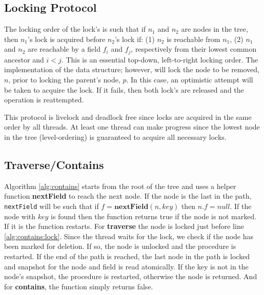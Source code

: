 \documentclass[conference]{IEEEtran}
\theoremstyle{definition}
\theoremstyle{theorem}
\begin{document}
\subsection{Locking Protocol}
The locking order of the lock's is such that if $n_1$ and $n_2$ are nodes in the tree, then $n_1$'s lock is acquired before $n_2$'s lock if: (1) $n_2$ is reachable from $n_1$, (2) $n_1$ and $n_2$ are reachable by a field $f_i$ and $f_j$, respectively from their lowest common ancestor and $i<j$. This is an essential top-down, left-to-right locking order. The implementation of the data structure; however, will lock the node to be removed, $n$, prior to locking the parent's node, $p$. In this case, an optimistic attempt will be taken to acquire the lock. If it fails, then both lock's are released and the operation is reattempted.

This protocol is livelock and deadlock free since locks are acquired in the same order by all threads. At least one thread can make progress since the lowest node in the tree (level-ordering) is guaranteed to acquire all necessary locks.

\subsection{Traverse/Contains}
Algorithm \ref{alg:contains} starts from the root of the tree and uses a helper function \textbf{nextField} to reach the next node. If the node is the last in the path, \texttt{nextField} will be such that if $f=\mathbf{nextField}(n, key)$ then $n.f = null$. If the node with $key$ is found then the function returns true if the node is not marked. If it is the function restarts. For \textbf{traverse} the node is locked just before line \ref{alg:contains:lock}. Since the thread waits for the lock, we check if the node has been marked for deletion. If so, the node is unlocked and the procedure is restarted. If the end of the path is reached, the last node in the path is locked and snapshot for the node and field is read atomically. If the key is not in the node's snapshot, the procedure is restarted, otherwise the node is returned. And for \textbf{contains}, the function simply returns false.
\end{document}
